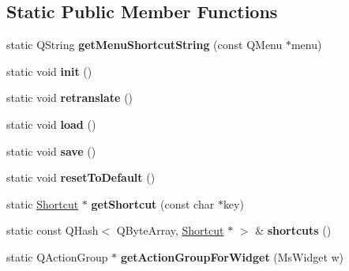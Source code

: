 \subsection*{Static Public Member Functions}
\begin{DoxyCompactItemize}
\item 
\mbox{\label{class_ms_1_1_shortcut_a75b5af2bc3fb8c9f2ef58463067df43f}} 
static Q\+String {\bfseries get\+Menu\+Shortcut\+String} (const Q\+Menu $\ast$menu)
\item 
\mbox{\label{class_ms_1_1_shortcut_ae0a2677e1b43da7c7e1d1881a7d36d67}} 
static void {\bfseries init} ()
\item 
\mbox{\label{class_ms_1_1_shortcut_a886f55521162f0f4b386b93ff9fa2fe2}} 
static void {\bfseries retranslate} ()
\item 
\mbox{\label{class_ms_1_1_shortcut_a3e25e324c1b8561cd57526803606a828}} 
static void {\bfseries load} ()
\item 
\mbox{\label{class_ms_1_1_shortcut_a430780531fb780305fcdaea1d12ce88d}} 
static void {\bfseries save} ()
\item 
\mbox{\label{class_ms_1_1_shortcut_ac572e0eca87a5e530f247acd52e2deee}} 
static void {\bfseries reset\+To\+Default} ()
\item 
\mbox{\label{class_ms_1_1_shortcut_a71a60c66d20469b53d7038e67eff2522}} 
static \hyperlink{class_ms_1_1_shortcut}{Shortcut} $\ast$ {\bfseries get\+Shortcut} (const char $\ast$key)
\item 
\mbox{\label{class_ms_1_1_shortcut_a6b59cffd6e6792323f17314e4c017296}} 
static const Q\+Hash$<$ Q\+Byte\+Array, \hyperlink{class_ms_1_1_shortcut}{Shortcut} $\ast$ $>$ \& {\bfseries shortcuts} ()
\item 
\mbox{\label{class_ms_1_1_shortcut_a58dac1af998c313c5c4eaf2e799c881a}} 
static Q\+Action\+Group $\ast$ {\bfseries get\+Action\+Group\+For\+Widget} (Ms\+Widget w)
\item 
\mbox{\label{class_ms_1_1_shortcut_a8dc99f344e7e8869183f39d9ae06a7cb}} 

\end{DoxyCompactItemize}

